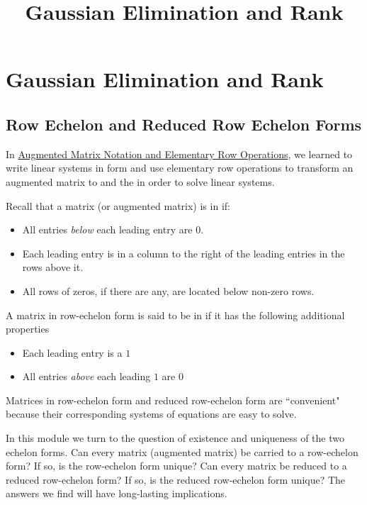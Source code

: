 \documentclass{ximera}
\title{Gaussian Elimination and Rank} \license{CC BY-NC-SA 4.0}
\begin{document}
\begin{abstract}
 
\end{abstract}
\maketitle

\section*{Gaussian Elimination and Rank}
\subsection*{Row Echelon and Reduced Row Echelon Forms}

In \href{https://ximera.osu.edu/oerlinalg/LinearAlgebra/SYS-0020/main}{Augmented Matrix Notation and Elementary Row Operations}, we learned to write linear systems in  form and use elementary row operations to transform an augmented matrix to  and the  in order to solve linear systems.  

Recall that a matrix (or augmented matrix) is in  if:
\begin{itemize}
\item All entries {\it below} each leading entry are $0$.
\item Each leading entry is in a column to the right of the leading entries in the rows above it.
\item All rows of zeros, if there are any, are located below non-zero rows.
\end{itemize}

A matrix in row-echelon form is said to be in  if it has the following additional properties
\begin{itemize}
\item Each leading entry is a $1$
\item All entries {\it above} each leading $1$ are $0$
\end{itemize}


Matrices in row-echelon form and reduced row-echelon form are ``convenient" because their corresponding systems of equations are easy to solve.  

In this module we turn to the question of existence and uniqueness of the two echelon forms.  Can every matrix (augmented matrix) be carried to a row-echelon form?  If so, is the row-echelon form unique?  Can every matrix be reduced to a reduced row-echelon form?  If so, is the reduced row-echelon form unique?  The answers we find will have long-lasting implications.
\end{document}
